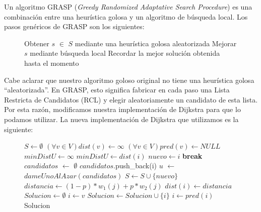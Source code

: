 Un algoritmo GRASP (\emph{Greedy Randomized Adaptative Search Procedure}) es una combinación entre una heurística golosa y un algoritmo de búsqueda local. Los pasos genéricos de GRASP son los siguientes:

\begin{center}
 \begin{figure}[H]
  \begin{pseudo}
    \State Obtener $s$ $\in$ $S$ mediante una heurística golosa aleatorizada
    \State Mejorar $s$ mediante búsqueda local
    \State Recordar la mejor solución obtenida hasta el momento
    \EndWhile
    \EndProcedure
  \end{pseudo}
 \end{figure}
\end{center}

Cabe aclarar que nuestro algoritmo goloso original no tiene una heurística golosa ``aleatorizada''. En GRASP, esto significa fabricar en cada paso una Lista Restricta de Candidatos (RCL) y elegir aleatoriamente un candidato de esta lista. Por esta razón, modificamos nuestra implementación de Dijkstra para que lo podamos utilizar. La nueva implementación de Dijkstra que utilizamos es la siguiente:

\begin{center}
 \begin{figure}[H]
  \begin{pseudo}
    \State $S \leftarrow \emptyset$
    \State $(\forall v \in V) dist(v) \leftarrow \infty$
    \State $(\forall v \in V) pred(v) \leftarrow NULL$
    \State $minDistU \leftarrow \infty$
	\State $minDistU \leftarrow dist(i)$
	\State $nuevo \leftarrow i$
      \EndIf
    \EndFor
      \State \textbf{break}
    \EndIf
    \State $candidatos$ $\leftarrow$ $\emptyset$
	\State $candidatos$.push\_back(i)
      \EndIf
    \EndFor
    \State $u$ $\leftarrow$ $dameUnoAlAzar(candidatos)$
    \State $S \leftarrow S \cup \{nuevo\}$
      \State $distancia \leftarrow (1-p)*w_1(j) + p*w_2(j)$
	\State $dist(i) \leftarrow distancia$
      \EndIf
    \EndFor
    \EndWhile
    \State $Solucion \leftarrow \emptyset$
    \State $i \leftarrow v$
      \State $Solucion \leftarrow Solucion \cup \{i\}$
      \State $i \leftarrow pred(i)$
    \EndWhile
    \Return Solucion
    \EndProcedure
  \end{pseudo}
 \end{figure}
\end{center}

